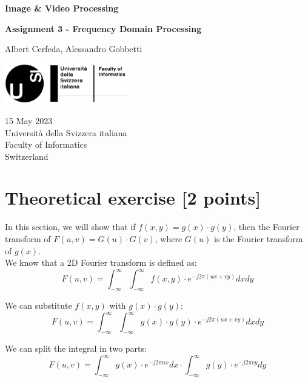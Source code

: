 \documentclass[tikz,14pt,fleqn]{article}
\newcommand\namesurname{Albert Cerfeda, Alessandro Gobbetti}
\newcommand\assignment{Assignment 3 - Frequency Domain Processing}
\newcommand\subject{Image \& Video Processing}
\newcommand\documentdate{15 May 2023}
\begin{document}
\begin{titlepage}
   \begin{center}
       \vspace*{0.2cm}

       \textbf{\Large{\subject}}

       \vspace{0.5cm}
        \textbf{\assignment}\\[5mm]
        
            
       \vspace{0.4cm}

        \namesurname
        \begin{figure}[H]
            \centering
        \end{figure}
       \tableofcontents

       \vspace*{\fill}
     
        \includegraphics[width=0.4\textwidth]{fig/logo.png}
       
        \documentdate \\
        Università della Svizzera italiana\\
        Faculty of Informatics\\
        Switzerland\\

   \end{center}
\end{titlepage}

\section{Theoretical exercise [2 points]}
In this section, we will show that if $f(x,y) = g(x)\cdot g(y)$, then the Fourier transform of $F(u,v) = G(u)\cdot G(v)$, where $G(u)$ is the Fourier transform of $g(x)$.\\
We know that a 2D Fourier transform is defined as:
$$F(u,v) = \int_{-\infty}^{\infty} \int_{-\infty}^{\infty} f(x,y) \cdot e^{-j2\pi(ux+vy)} dx dy$$

We can substitute $f(x,y)$ with $g(x)\cdot g(y)$:
$$F(u,v) = \int_{-\infty}^{\infty} \int_{-\infty}^{\infty} g(x)\cdot g(y) \cdot e^{-j2\pi(ux+vy)} dx dy$$

We can split the integral in two parts:
$$F(u,v) = \int_{-\infty}^{\infty} g(x) \cdot e^{-j2\pi ux} dx \cdot \int_{-\infty}^{\infty} g(y) \cdot e^{-j2\pi vy} dy$$
\end{document}
